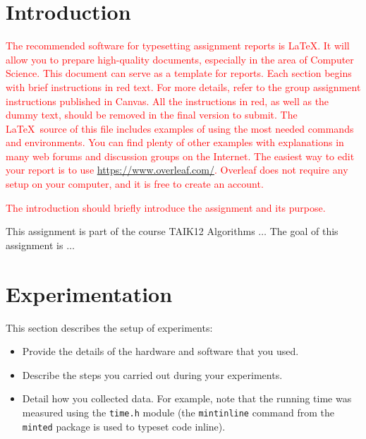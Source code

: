 \documentclass{scrartcl}
\title{\reportname}
\subtitle{Sorting Algorithms and Experiment Planning}
\author{Name1\and Name2\and Name3}
\date{\today}
\begin{document}
\maketitle

\tableofcontents 


\section{Introduction}
\label{sec:intro}

\textcolor{red}{The recommended software for typesetting assignment reports is \LaTeX. It will allow you to prepare high-quality documents, especially in the area of Computer Science. This document can serve as a template for reports. Each section begins with brief instructions in red text. For more details, refer to the group assignment instructions published in Canvas. All the instructions in red, as well as the dummy text, should be removed in the final version to submit. The \LaTeX\ source of this file includes examples of using the most needed commands and environments. You can find plenty of other examples with explanations in many web forums and discussion groups on the Internet. The easiest way to edit your report is to use \url{https://www.overleaf.com/}. Overleaf does not require any setup on your computer, and it is free to create an account.} 

\textcolor{red}{The introduction should briefly introduce the assignment and its purpose.}

This assignment is part of the course TAIK12 Algorithms $\ldots$ The goal of this assignment is $\ldots$

\lipsum[1]


\section{Experimentation}
\label{sec:experimentation}

{
\color{red}This section describes the setup of experiments:

\begin{itemize}
\item Provide the details of the hardware and software that you used.
\item Describe the steps you carried out during your experiments.
\item Detail how you collected data. For example, note that the running time was measured using the \texttt{time.h} module (the \texttt{mintinline} command from the \texttt{minted} package is used to typeset code inline).
\end{itemize}

}
\end{document}
